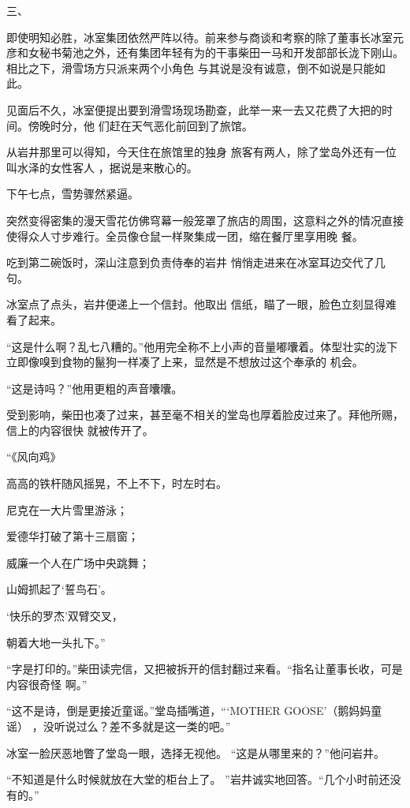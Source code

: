 \documentclass{article}
\begin{document}
三、 

即使明知必胜，冰室集团依然严阵以待。前来参与商谈和考察的除了董事长冰室元彦和女秘书菊池之外，还有集团年轻有为的干事柴田一马和开发部部长泷下刚山。相比之下，滑雪场方只派来两个小角色
与其说是没有诚意，倒不如说是只能如此。 

见面后不久，冰室便提出要到滑雪场现场勘查，此举一来一去又花费了大把的时间。傍晚时分，他
们赶在天气恶化前回到了旅馆。 

从岩井那里可以得知，今天住在旅馆里的独身
\newpage
旅客有两人，除了堂岛外还有一位叫水泽的女性客人
，据说是来散心的。 


下午七点，雪势骤然紧逼。 

突然变得密集的漫天雪花仿佛穹幕一般笼罩了旅店的周围，这意料之外的情况直接使得众人寸步难行。全员像仓鼠一样聚集成一团，缩在餐厅里享用晚
餐。 

吃到第二碗饭时，深山注意到负责侍奉的岩井
悄悄走进来在冰室耳边交代了几句。 

冰室点了点头，岩井便递上一个信封。他取出
信纸，瞄了一眼，脸色立刻显得难看了起来。 

“这是什么啊？乱七八糟的。”他用完全称不上小声的音量嘟囔着。体型壮实的泷下立即像嗅到食物的鬣狗一样凑了上来，显然是不想放过这个奉承的
机会。 

\newpage


“这是诗吗？”他用更粗的声音囔囔。 

受到影响，柴田也凑了过来，甚至毫不相关的堂岛也厚着脸皮过来了。拜他所赐，信上的内容很快
就被传开了。 


“《风向鸡》 

高高的铁杆随风摇晃，不上不下，时左时右。


尼克在一大片雪里游泳； 


爱德华打破了第十三扇窗； 


威廉一个人在广场中央跳舞； 


山姆抓起了‘誓鸟石’。 


‘快乐的罗杰’双臂交叉， 


\newpage

朝着大地一头扎下。” 

“字是打印的。”柴田读完信，又把被拆开的信封翻过来看。“指名让董事长收，可是内容很奇怪
啊。” 

“这不是诗，倒是更接近童谣。”堂岛插嘴道，“‘MOTHER GOOSE’（鹅妈妈童谣）
，没听说过么？差不多就是这一类的吧。” 

冰室一脸厌恶地瞥了堂岛一眼，选择无视他。
“这是从哪里来的？”他问岩井。 

“不知道是什么时候就放在大堂的柜台上了。
”岩井诚实地回答。“几个小时前还没有的。” 
\end{document}

